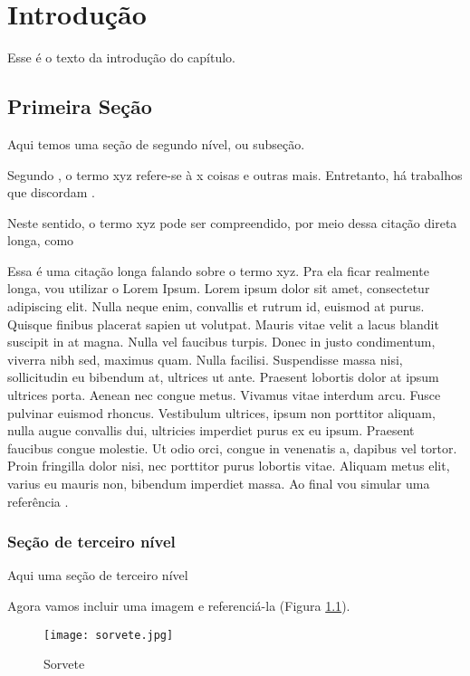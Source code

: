 \chapter{Introdução}

Esse é o texto da introdução do capítulo. 

\section{Primeira Seção}

Aqui temos uma seção de segundo nível, ou subseção.

Segundo , o termo xyz refere-se à x coisas e outras mais. Entretanto, há trabalhos que discordam \cite{ArtigoDeCongresso2017}.

Neste sentido, o termo xyz pode ser compreendido, por meio dessa citação direta longa, como

\begin{citacao}
	Essa é uma citação longa falando sobre o termo xyz. Pra ela ficar realmente longa, vou utilizar o Lorem Ipsum. Lorem ipsum dolor sit amet, consectetur adipiscing elit. Nulla neque enim, convallis et rutrum id, euismod at purus. Quisque finibus placerat sapien ut volutpat. Mauris vitae velit a lacus blandit suscipit in at magna. Nulla vel faucibus turpis. Donec in justo condimentum, viverra nibh sed, maximus quam. Nulla facilisi. Suspendisse massa nisi, sollicitudin eu bibendum at, ultrices ut ante. Praesent lobortis dolor at ipsum ultrices porta. Aenean nec congue metus. Vivamus vitae interdum arcu. Fusce pulvinar euismod rhoncus. Vestibulum ultrices, ipsum non porttitor aliquam, nulla augue convallis dui, ultricies imperdiet purus ex eu ipsum. Praesent faucibus congue molestie. Ut odio orci, congue in venenatis a, dapibus vel tortor. Proin fringilla dolor nisi, nec porttitor purus lobortis vitae. Aliquam metus elit, varius eu mauris non, bibendum imperdiet massa. Ao final vou simular uma referência \cite[p.20]{Livro1990}.
\end{citacao}

\subsection{Seção de terceiro nível} \label{sec:outra}

Aqui uma seção de terceiro nível

Agora vamos incluir uma imagem e referenciá-la (Figura \ref{fig:sorvete}).

\begin{figure}[H]
	\centering
	\caption{Sorvete}
	\centering
	\texttt{[image: sorvete.jpg]}
	\label{fig:sorvete}
\end{figure}

